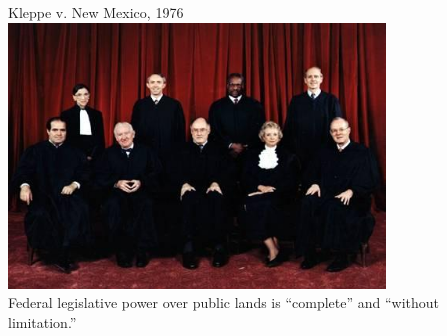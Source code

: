 %
%
%
%

\begin{frame}{Kleppe v. New Mexico, 1976}
    \centering
    \includegraphics[width=0.75\textwidth]{img/sc-1976.png} \\
    { \large Federal legislative power over public lands is ``complete'' and
    ``without limitation.'' \\ }
\end{frame}

